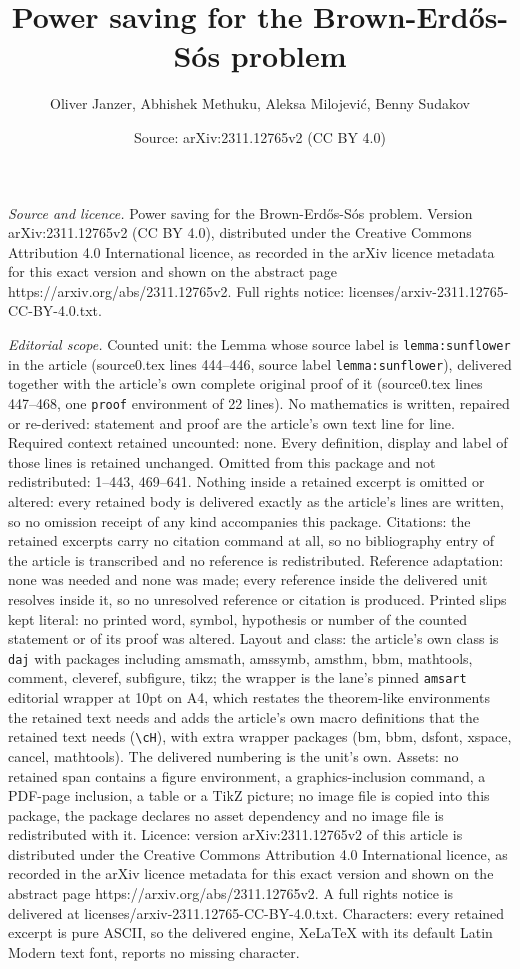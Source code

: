 \documentclass[10pt,a4paper]{amsart}
\title[Power saving for the Brown-Erd\H{o}s-S\'os problem]{Power saving for the Brown-Erd\H{o}s-S\'os problem}
\author{Oliver Janzer, Abhishek Methuku, Aleksa Milojevi\'c, Benny Sudakov}
\date{Source: arXiv:2311.12765v2 (CC BY 4.0)}
\begin{document}
\maketitle

\noindent\emph{Source and licence.} Power saving for the Brown-Erd\H{o}s-S\'os problem. Version arXiv:2311.12765v2 (CC BY 4.0), distributed under the Creative Commons Attribution 4.0 International licence, as recorded in the arXiv licence metadata for this exact version and shown on the abstract page https://arxiv.org/abs/2311.12765v2. Full rights notice: licenses/arxiv-2311.12765-CC-BY-4.0.txt.\par\smallskip

\noindent\textit{Editorial scope.} Counted unit: the Lemma whose source label is \texttt{lemma:sunflower} in the article (source0.tex lines 444--446, source label \texttt{lemma:sunflower}), delivered together with the article's own complete original proof of it (source0.tex lines 447--468, one \texttt{proof} environment of 22 lines). No mathematics is written, repaired or re-derived: statement and proof are the article's own text line for line. Required context retained uncounted: none. Every definition, display and label of those lines is retained unchanged. Omitted from this package and not redistributed: 1--443, 469--641. Nothing inside a retained excerpt is omitted or altered: every retained body is delivered exactly as the article's lines are written, so no omission receipt of any kind accompanies this package. Citations: the retained excerpts carry no citation command at all, so no bibliography entry of the article is transcribed and no reference is redistributed. Reference adaptation: none was needed and none was made; every reference inside the delivered unit resolves inside it, so no unresolved reference or citation is produced. Printed slips kept literal: no printed word, symbol, hypothesis or number of the counted statement or of its proof was altered. Layout and class: the article's own class is \texttt{daj} with packages including amsmath, amssymb, amsthm, bbm, mathtools, comment, cleveref, subfigure, tikz; the wrapper is the lane's pinned \texttt{amsart} editorial wrapper at 10pt on A4, which restates the theorem-like environments the retained text needs and adds the article's own macro definitions that the retained text needs (\texttt{\textbackslash cH}), with extra wrapper packages (bm, bbm, dsfont, xspace, cancel, mathtools). The delivered numbering is the unit's own. Assets: no retained span contains a figure environment, a graphics-inclusion command, a PDF-page inclusion, a table or a TikZ picture; no image file is copied into this package, the package declares no asset dependency and no image file is redistributed with it. Licence: version arXiv:2311.12765v2 of this article is distributed under the Creative Commons Attribution 4.0 International licence, as recorded in the arXiv licence metadata for this exact version and shown on the abstract page https://arxiv.org/abs/2311.12765v2. A full rights notice is delivered at licenses/arxiv-2311.12765-CC-BY-4.0.txt. Characters: every retained excerpt is pure ASCII, so the delivered engine, XeLaTeX with its default Latin Modern text font, reports no missing character.
\end{document}

